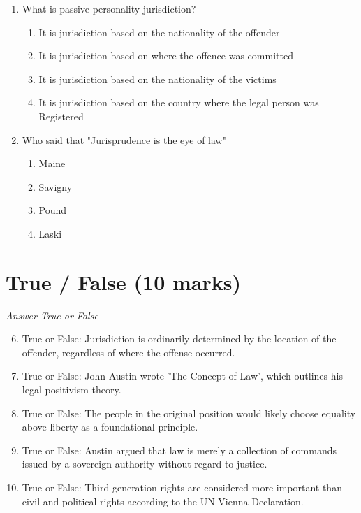 \documentclass[12pt]{article}
\begin{document}
\begin{enumerate}[label=\arabic*.]
\begin{enumerate}[label=(\alph*)]
\end{enumerate}
\item What is passive personality jurisdiction?
\begin{enumerate}[label=(\alph*)]
    \item It is jurisdiction based on the nationality of the offender
    \item It is jurisdiction based on where the offence was committed
    \item It is jurisdiction based on the nationality of the victims
    \item It is jurisdiction based on the country where the legal person was Registered
\end{enumerate}
\item Who said that "Jurisprudence is the eye of law"
\begin{enumerate}[label=(\alph*)]
    \item Maine
    \item Savigny
    \item Pound
    \item Laski
\end{enumerate}
\end{enumerate}

\section*{True / False (10 marks)}
\textit{Answer True or False}
\begin{enumerate}[label=\arabic*.]
\setcounter{enumi}{5}
\item True or False: Jurisdiction is ordinarily determined by the location of the offender, regardless of where the offense occurred.
\item True or False: John Austin wrote 'The Concept of Law', which outlines his legal positivism theory.
\item True or False: The people in the original position would likely choose equality above liberty as a foundational principle.
\item True or False: Austin argued that law is merely a collection of commands issued by a sovereign authority without regard to justice.
\item True or False: Third generation rights are considered more important than civil and political rights according to the UN Vienna Declaration.
\end{enumerate}
\end{document}
